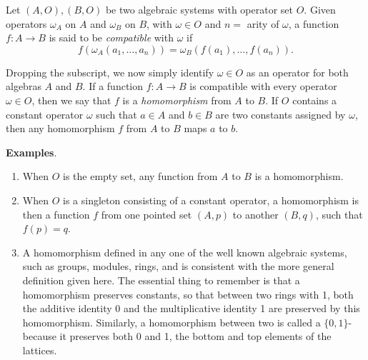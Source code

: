 \documentclass[12pt]{article}
\begin{document}
Let $(A,O),(B,O)$ be two algebraic systems with operator set $O$.  Given operators $\omega_A$ on $A$ and $\omega_B$ on $B$, with $\omega\in O$ and $n=$ arity of $\omega$, a function $f:A\to B$ is said to be \emph{compatible} with $\omega$ if $$f(\omega_A(a_1,\ldots,a_n))=\omega_B(f(a_1),\ldots,f(a_n)).$$

Dropping the subscript, we now simply identify $\omega\in O$ as an operator for both algebras $A$ and $B$.  If a function $f:A\to B$ is compatible with every operator $\omega\in O$, then we say that $f$ is a \emph{homomorphism} from $A$ to $B$.  If $O$ contains a constant operator $\omega$ such that $a\in A$ and $b\in B$ are two constants assigned by $\omega$, then any homomorphism $f$ from $A$ to $B$ maps $a$ to $b$.

\textbf{Examples}.
\begin{enumerate}
\item When $O$ is the empty set, any function from $A$ to $B$ is a homomorphism.  
\item When $O$ is a singleton consisting of a constant operator, a homomorphism is then a function $f$ from one pointed set $(A,p)$ to another $(B,q)$, such that $f(p)=q$.
\item A homomorphism defined in any one of the well known algebraic systems, such as groups, modules, rings, and  is consistent with the more general definition given here.  The essential thing to remember is that a homomorphism preserves constants, so that between two rings with 1, both the additive identity 0 and the multiplicative identity 1 are preserved by this homomorphism.  Similarly, a homomorphism between two  is called a $\lbrace 0,1\rbrace$- because it preserves both 0 and 1, the bottom and top elements of the lattices.
\end{enumerate}
\end{document}
